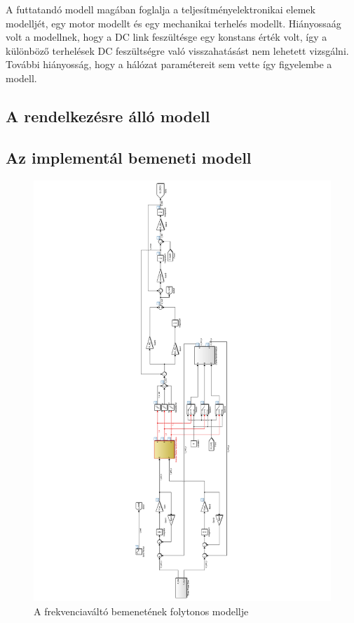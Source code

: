 A futtatandó modell magában foglalja a teljesítményelektronikai elemek modelljét, egy motor modellt és egy mechanikai terhelés modellt. Hiányossaág volt a modellnek, hogy a DC link feszültésge egy konstans érték volt, így a különböző terhelések DC feszültségre való visszahatásást nem lehetett vizsgálni. További hiányosság, hogy a hálózat paramétereit sem vette így figyelembe a modell.

\subsection{A rendelkezésre álló modell}

\subsection{Az implementál bemeneti modell}

\begin{figure}[]
	\centering
	\includegraphics[width = \textwidth]{figures/model_continous.pdf}
	\caption{A frekvenciaváltó bemenetének folytonos modellje} 
	\label{fig:cont_input_model}
\end{figure}

